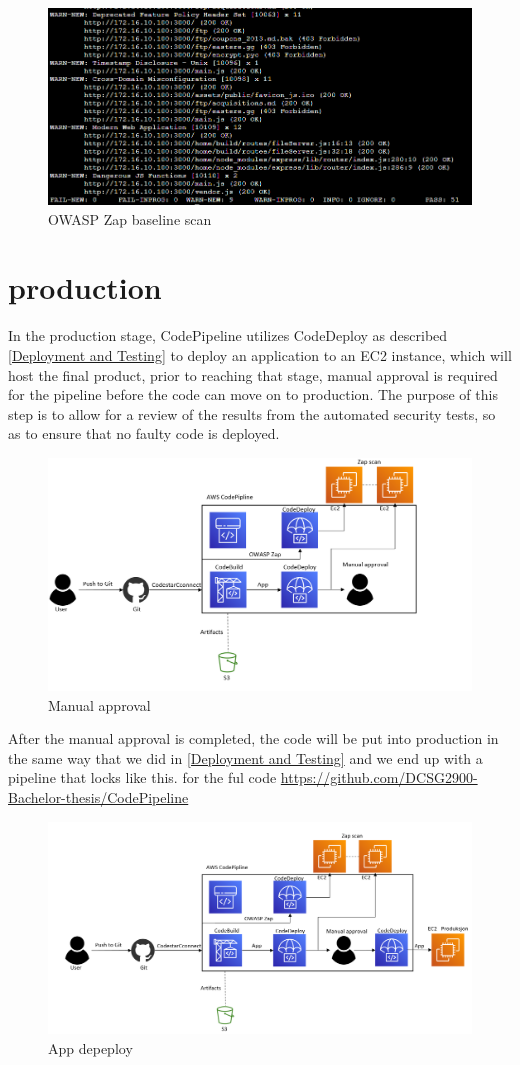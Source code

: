 \vspace{2mm}
\begin{figure}[H]
    \centering
    \includegraphics[width=0.8\columnwidth]{Images/owasp-zap-scan.png}
    \caption{OWASP Zap baseline scan}
    \label{fig: OWASP Zap baseline scan}
\end{figure}


\section{production}

In the production stage, CodePipeline utilizes CodeDeploy as described \ref{Deployment and Testing} to deploy an application to an EC2 instance, which will host the final product, prior to reaching that stage, manual approval is required for the pipeline before the code can move on to production. The purpose of this step is to allow for a review of the results from the automated security tests, so as to ensure that no faulty code is deployed.


\vspace{2mm}
\begin{figure}[H]
    \centering
    \includegraphics[width=0.8\columnwidth]{Images/aws-piplin-6.png}
    \caption{Manual approval}
    \label{fig: Manual approval}
\end{figure}

After the manual approval is completed, the code will be put into production in the same way that we did in \ref{Deployment and Testing} and we end up with a pipeline that locks like this. for the ful code \url{https://github.com/DCSG2900-Bachelor-thesis/CodePipeline}

\vspace{2mm}
\begin{figure}[H]
    \centering
    \includegraphics[width=0.8\columnwidth]{Images/aws-piplin-7.png}
    \caption{App depeploy}
    \label{fig: App depeploy}
\end{figure}